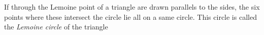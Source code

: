 \documentclass[12pt]{article}
\begin{document}
If through the Lemoine point of a triangle are drawn parallels to the sides, the six points where these intersect the circle lie all on a same circle. This circle is called the \emph{Lemoine circle} of the triangle
\end{document}
